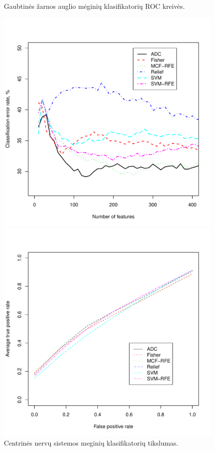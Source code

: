 \begin{figure}[H]
\begin{minipage}[b]{0.5\linewidth}
\caption{Gaubtinės žarnos auglio mėginių klasifikatorių ROC kreivės.}
\label{fig:roc_colon}
\end{minipage}
\hspace{0.2cm}
\begin{minipage}[b]{0.5\linewidth}
\centering
\includegraphics[width=.85\textwidth]{../bachelor/images/nncns_classification.pdf}
\caption{Centrinės nervų sistemos meginių klasifikatorių tikslumas.}
\label{fig:class_cns}
\end{minipage}
\hspace{0.2cm}
\begin{minipage}[b]{0.5\linewidth}
\centering
\includegraphics[width=.85\textwidth]{../bachelor/images/nncns_roc.pdf}

\end{minipage}
\end{figure}
